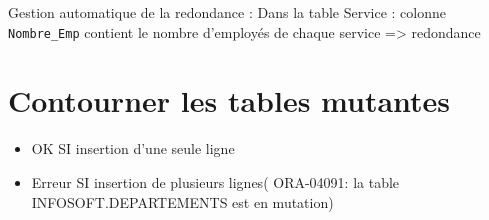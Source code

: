 \documentclass[10pt]{beamer}
\begin{document}
\begin{frame}{\secname}
    
\end{frame}

\begin{frame}[allowframebreaks]{\secname}
    
\end{frame}


\begin{frame}[allowframebreaks]{\secname}
    Gestion automatique de la redondance :
    Dans la table Service : colonne \lstinline[language=plsql]!Nombre_Emp! contient le nombre d'employés de chaque service => redondance
\end{frame}

\begin{frame}[allowframebreaks]{\secname}
    
\end{frame}

\begin{frame}{\secname}
    
\end{frame}

\begin{frame}[allowframebreaks]{\secname}
    
\end{frame}


\section{Contourner les tables mutantes}
\begin{frame}[allowframebreaks]{\secname}
    
    \begin{itemize}
        \item OK  SI insertion d’une seule ligne
        \item Erreur SI insertion de plusieurs lignes( ORA-04091: la table INFOSOFT.DEPARTEMENTS est en mutation)
    \end{itemize}
\end{frame}
\end{document}
